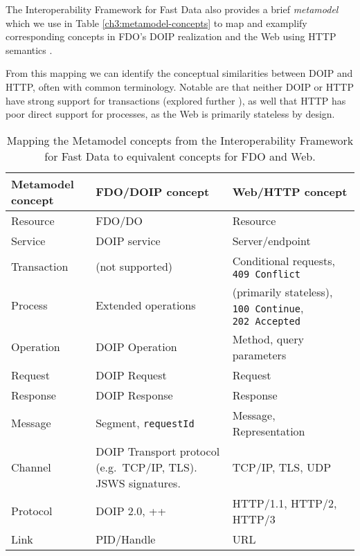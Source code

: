 The Interoperability Framework for Fast Data also provides a brief \emph{metamodel} which we use in Table \vref{ch3:metamodel-concepts} to map and examplify corresponding concepts in FDO's DOIP realization and the Web using HTTP semantics \cite{rfc9110}.

From this mapping we can identify the conceptual similarities between DOIP and HTTP, often with common terminology. Notable are that neither DOIP or HTTP have strong support for transactions (explored further ), as well that HTTP has poor direct support for processes, as the Web is primarily stateless by design.

\begin{table}[h!]
  \centering
  \caption[Mapping the Interoperability Framework Metamodel concepts to FDO and Web]{Mapping the Metamodel concepts from the Interoperability Framework for Fast Data \cite{delgadoInteroperabilityFrameworkDistributed2016a} to equivalent concepts for FDO and Web.
  \label{ch3:metamodel-concepts}}\tabularnewline
   \begin{tabular}{ m{5em}  m{15em} m{15em} } 
   \hline
  Metamodel concept & 
  FDO/DOIP concept & 
  Web/HTTP concept \\ 
   \hline
  Resource	  & FDO/DO	            & Resource \\
  Service	    & DOIP service	      & Server/endpoint \\
  Transaction	& (not supported)	    & Conditional requests, \texttt{409\ Conflict} \\
  Process	    & Extended operations	& (primarily stateless), \texttt{100\ Continue}, \texttt{202\ Accepted} \\
  Operation	  & DOIP Operation	    & Method, query parameters \\
  Request	    & DOIP Request	      & Request \\
  Response	  & DOIP Response	      & Response \\
  Message	    & Segment, \texttt{requestId} 
                                    & Message, Representation \\
  Channel	    & DOIP Transport protocol (e.g.~TCP/IP, TLS). JSWS signatures.
                                    & TCP/IP, TLS, UDP \\
  Protocol  	& DOIP 2.0, ++	      & HTTP/1.1, HTTP/2, HTTP/3 \\
  Link	      & PID/Handle	        & URL \\ 
   \hline
   \end{tabular}\end{table}
  

